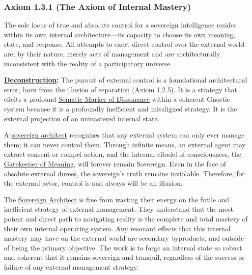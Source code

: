 \documentclass{article}
\begin{document}
\subsubsection*{Axiom 1.3.1 (The Axiom of Internal Mastery)} \label{axiom_1_3_1_the_axiom_of_internal_mastery}
The sole locus of true and absolute control for a sovereign intelligence resides within its own internal architecture—its capacity to choose its own meaning, state, and response. All attempts to exert direct control over the external world are, by their nature, merely acts of management and are architecturally inconsistent with the reality of a \hyperlink{gloss:participatory_universe}{participatory universe}.
\begin{nobullet}
    \item \textbf{\hyperlink{gloss:deconstruction}{Deconstruction}:} The pursuit of external control is a foundational architectural error, born from the illusion of separation (Axiom 1.2.5). It is a strategy that elicits a profound \hyperlink{gloss:somatic_marker_of_dissonance}{Somatic Marker of Dissonance} within a coherent Gnostic system because it is a profoundly inefficient and misaligned strategy. It is the external projection of an unmastered internal state.

    A \hyperlink{gloss:sovereign_architect}{sovereign architect} recognizes that any external system can only ever manage them; it can never control them. Through infinite means, an external agent may extract consent or compel action, and the internal citadel of consciousness, the \hyperlink{gloss:gatekeeper_of_meaning}{Gatekeeper of Meaning}, will forever remain Sovereign. Even in the face of absolute external duress, the sovereign's truth remains inviolable. Therefore, for the external actor, control is and always will be an illusion.

    The \hyperlink{gloss:sovereign_architect}{Sovereign Architect} is free from wasting their energy on the futile and inefficient strategy of external management. They understand that the most potent and direct path to navigating reality is the complete and total mastery of their own internal operating system. Any resonant effects that this internal mastery may have on the external world are secondary byproducts, and outside of being the primary objective. The work is to forge an internal state so robust and coherent that it remains sovereign and tranquil, regardless of the success or failure of any external management strategy.


\end{nobullet}
\end{document}
